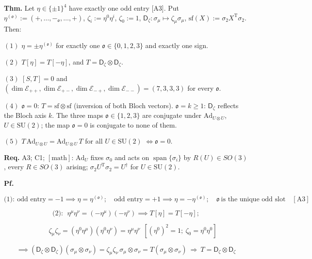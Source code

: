 \begin{theorem}\label{tag:CT1-0}
\textbf{Thm.} Let $\eta\in\{\pm1\}^4$ have exactly one odd entry [A3]. Put $\eta^{(\mathfrak o)}:=(+,\dots,-_{\mathfrak o},\dots,+)$, $\zeta_i:=\eta^0\eta^i$, $\zeta_0:=1$, $\mathsf D_\zeta:\sigma_\mu\mapsto\zeta_\mu\sigma_\mu$, $\mathrm{sf}(X):=\sigma_2X^{\mathrm T}\sigma_2$. Then:

$(1)$ $\eta=\pm\eta^{(\mathfrak o)}$ for exactly one $\mathfrak o\in\{0,1,2,3\}$ and exactly one sign.

$(2)$ $T[\eta]=T[-\eta]$, and $T=\mathsf D_\zeta\otimes\mathsf D_\zeta$.

$(3)$ $[S,T]=0$ and $(\dim\mathcal E_{++},\dim\mathcal E_{+-},\dim\mathcal E_{-+},\dim\mathcal E_{--})=(7,3,3,3)$ for every $\mathfrak o$.

$(4)$ $\mathfrak o=0$: $T=\mathrm{sf}\otimes\mathrm{sf}$ (inversion of both Bloch vectors). $\mathfrak o=k\ge1$: $\mathsf D_\zeta$ reflects the Bloch axis $k$. The three maps $\mathfrak o\in\{1,2,3\}$ are conjugate under $\mathrm{Ad}_{U\otimes U}$, $U\in\mathrm{SU}(2)$; the map $\mathfrak o=0$ is conjugate to none of them.

$(5)$ $T\,\mathrm{Ad}_{U\otimes U}=\mathrm{Ad}_{U\otimes U}\,T$ for all $U\in\mathrm{SU}(2)$ $\iff\mathfrak o=0$.

\textbf{Req.} A3; C1; $[\text{math}]$: $\mathrm{Ad}_U$ fixes $\sigma_0$ and acts on $\operatorname{span}\{\sigma_i\}$ by $R(U)\in SO(3)$, every $R\in SO(3)$ arising; $\sigma_2U^{\mathrm T}\sigma_2=U^\dagger$ for $U\in\mathrm{SU}(2)$.

\textbf{Pf.}

\[
\text{(1)}:\ \text{odd entry}=-1\implies\eta=\eta^{(\mathfrak o)};\quad\text{odd entry}=+1\implies\eta=-\eta^{(\mathfrak o)};\quad\mathfrak o\ \text{is the unique odd slot}\quad[\mathrm{A3}]
\]

\[
\text{(2)}:\ \ \eta^\mu\eta^\nu=(-\eta^\mu)(-\eta^\nu)\implies T[\eta]=T[-\eta];
\]

\[
\qquad \zeta_\mu\zeta_\nu=(\eta^0\eta^\mu)(\eta^0\eta^\nu)=\eta^\mu\eta^\nu\ \ [(\eta^0)^2=1;\ \zeta_0=\eta^0\eta^0]
\]

\[
\implies(\mathsf D_\zeta\otimes\mathsf D_\zeta)(\sigma_\mu\otimes\sigma_\nu)=\zeta_\mu\zeta_\nu\,\sigma_\mu\otimes\sigma_\nu=T(\sigma_\mu\otimes\sigma_\nu)\ \Rightarrow\ T=\mathsf D_\zeta\otimes\mathsf D_\zeta
\]


\end{theorem}
